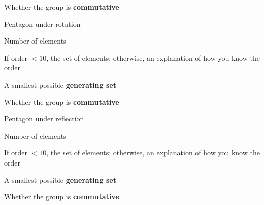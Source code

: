 \documentclass[../gatm_answers.tex]{subfiles}
\begin{document}
\begin{inner_problem}
\item Whether the group is \textbf{commutative}
\end{inner_problem}

\begin{outer_problem}
\item Pentagon under rotation
\end{outer_problem}

\begin{inner_problem}[start=1]
\item Number of elements
\end{inner_problem}

\begin{inner_problem}
\item If order $< 10$, the set of elements; otherwise, an explanation of how you know the order
\end{inner_problem}

\begin{inner_problem}
\item A smallest possible \textbf{generating set}
\end{inner_problem}

\begin{inner_problem}
\item Whether the group is \textbf{commutative}
\end{inner_problem}

\begin{outer_problem}
\item Pentagon under reflection
\end{outer_problem}

\begin{inner_problem}[start=1]
\item Number of elements
\end{inner_problem}

\begin{inner_problem}
\item If order $< 10$, the set of elements; otherwise, an explanation of how you know the order
\end{inner_problem}

\begin{inner_problem}
\item A smallest possible \textbf{generating set}
\end{inner_problem}

\begin{inner_problem}
\item Whether the group is \textbf{commutative}
\end{inner_problem}
\end{document}
